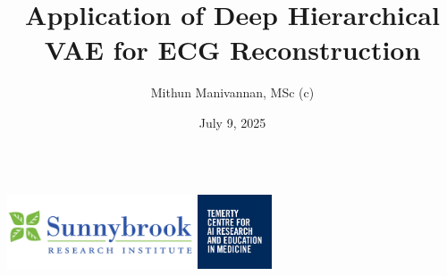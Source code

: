 \documentclass[aspectratio=169,11pt]{beamer}
\title[T-CAIREM Mid-Term]{Application of Deep Hierarchical VAE for ECG Reconstruction}
\author{Mithun Manivannan, MSc (c)}
\institute[T-CAIREM]{Schulich Heart Program \\ Sunnybrook Health Sciences Centre}
\date{July 9, 2025}
\begin{document}
\begin{frame}
  \titlepage

  \vspace{-3.5em}
  \begin{columns}[c]
    \centering\includegraphics[height=2.2cm]{SRI_logo.png}
    \centering\includegraphics[height=2.2cm]{TCAIREM_logo.jpg}
  \end{columns}
\end{frame}
\end{document}
